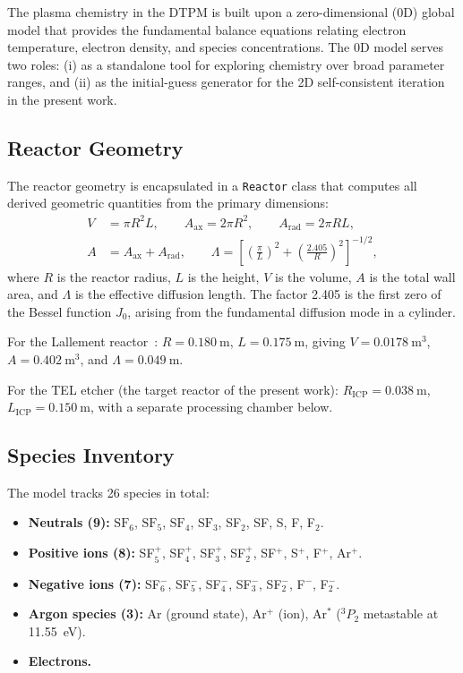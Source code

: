 \documentclass[11pt,a4paper]{report}
\newcommand{\SFsix}{\mathrm{SF}_6}
\newcommand{\SFfive}{\mathrm{SF}_5}
\newcommand{\SFfour}{\mathrm{SF}_4}
\newcommand{\SFthree}{\mathrm{SF}_3}
\begin{document}
The plasma chemistry in the DTPM is built upon a zero-dimensional (0D) global model that provides the fundamental balance equations relating electron temperature, electron density, and species concentrations.  The 0D model serves two roles: (i) as a standalone tool for exploring chemistry over broad parameter ranges, and (ii) as the initial-guess generator for the 2D self-consistent iteration in the present work.

\subsection{Reactor Geometry}

The reactor geometry is encapsulated in a \texttt{Reactor} class that computes all derived geometric quantities from the primary dimensions:
\begin{align}
  V &= \pi R^2 L, \qquad A_\mathrm{ax} = 2\pi R^2, \qquad A_\mathrm{rad} = 2\pi RL, \\
  A &= A_\mathrm{ax} + A_\mathrm{rad}, \qquad
  \Lambda = \left[\left(\frac{\pi}{L}\right)^2 + \left(\frac{2.405}{R}\right)^2\right]^{-1/2},
  \label{eq:reactor-geometry}
\end{align}
where $R$ is the reactor radius, $L$ is the height, $V$ is the volume, $A$ is the total wall area, and $\Lambda$ is the effective diffusion length.  The factor 2.405 is the first zero of the Bessel function $J_0$, arising from the fundamental diffusion mode in a cylinder.

For the Lallement reactor~\cite{Lallement2009}: $R = \SI{0.180}{\meter}$, $L = \SI{0.175}{\meter}$, giving $V = \SI{0.0178}{\meter\cubed}$, $A = \SI{0.402}{\meter\cubed}$, and $\Lambda = \SI{0.049}{\meter}$.

For the TEL etcher (the target reactor of the present work): $R_\mathrm{ICP} = \SI{0.038}{\meter}$, $L_\mathrm{ICP} = \SI{0.150}{\meter}$, with a separate processing chamber below.

\subsection{Species Inventory}

The model tracks 26 species in total:
\begin{itemize}
  \item \textbf{Neutrals (9):} $\SFsix$, $\SFfive$, $\SFfour$, $\SFthree$, SF$_2$, SF, S, F, F$_2$.
  \item \textbf{Positive ions (8):} SF$_5^+$, SF$_4^+$, SF$_3^+$, SF$_2^+$, SF$^+$, S$^+$, F$^+$, Ar$^+$.
  \item \textbf{Negative ions (7):} SF$_6^-$, SF$_5^-$, SF$_4^-$, SF$_3^-$, SF$_2^-$, F$^-$, F$_2^-$.
  \item \textbf{Argon species (3):} Ar (ground state), Ar$^+$ (ion), Ar$^*$ (${}^3P_2$ metastable at \SI{11.55}{\electronvolt}).
  \item \textbf{Electrons.}
\end{itemize}
\end{document}
